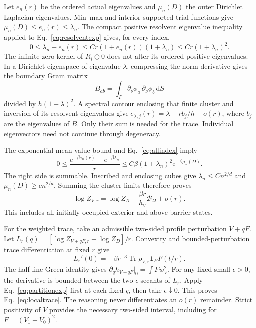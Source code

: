 \documentclass[aps,pra,reprint,superscriptaddress,longbibliography]{revtex4-2}
\newcommand{\dd}{\mathrm d}
\newcommand{\Tr}{\operatorname{Tr}}
\newcommand{\calB}{\mathcal B}
\begin{document}
Let $e_n(r)$ be the ordered actual eigenvalues and $\mu_n(D)$ the outer Dirichlet Laplacian eigenvalues. Min--max and interior-supported trial functions give $\mu_n(D)\le e_n(r)\le\lambda_n$. The compact positive resolvent eigenvalue inequality applied to Eq.~\eqref{eq:resolventexp} gives, for every index,
\begin{equation}
 0\le\lambda_n-e_n(r)
       \le Cr(1+e_n(r))(1+\lambda_n)
       \le Cr(1+\lambda_n)^2.\label{eq:allindex}
\end{equation}
The infinite zero kernel of $R_i\oplus0$ does not alter its ordered positive eigenvalues. In a Dirichlet eigenspace of eigenvalue $\lambda$, compressing the norm derivative gives the boundary Gram matrix
\begin{equation}
 B_{ab}=\int_\Gamma\overline{\partial_\nu\phi_a}\,
          \partial_\nu\phi_b\,\dd S
 \label{eq:gram}
\end{equation}
divided by $h(1+\lambda)^2$. A spectral contour enclosing that finite cluster and inversion of its resolvent eigenvalues give $e_{\lambda,j}(r)=\lambda-rb_j/h+o(r)$, where $b_j$ are the eigenvalues of $B$. Only their sum is needed for the trace. Individual eigenvectors need not continue through degeneracy.

The exponential mean-value bound and Eq.~\eqref{eq:allindex} imply
\begin{equation}
 0\le\frac{e^{-\beta e_n(r)}-e^{-\beta\lambda_n}}r
       \le C\beta(1+\lambda_n)^2 e^{-\beta\mu_n(D)}.\label{eq:heatmajorant}
\end{equation}
The right side is summable. Inscribed and enclosing cubes give $\lambda_n\le Cn^{2/d}$ and $\mu_n(D)\ge cn^{2/d}$. Summing the cluster limits therefore proves
\begin{equation}
 \log Z_{V,r}=\log Z_D+\frac{\beta r}{h_V}\calB_\Omega+o(r).
 \label{eq:partitionexp}
\end{equation}
This includes all initially occupied exterior and above-barrier states.

For the weighted trace, take an admissible two-sided profile perturbation $V+qF$. Let $L_r(q)=[\log Z_{V+qF,r}-\log Z_D]/r$. Convexity and bounded-perturbation trace differentiation at fixed $r$ give
\begin{equation}
 L_r'(0)=-\beta r^{-3}\Tr\rho_{V,r}\mathbf1_EF(t/r).
 \label{eq:convexderivative}
\end{equation}
The half-line Green identity gives $\partial_qh_{V+qF}|_0=\int Fw_V^2$. For any fixed small $\epsilon>0$, the derivative is bounded between the two $\epsilon$-secants of $L_r$. Apply Eq.~\eqref{eq:partitionexp} first at each fixed $q$, then take $\epsilon\downarrow0$. This proves Eq.~\eqref{eq:localtrace}. The reasoning never differentiates an $o(r)$ remainder. Strict positivity of $V$ provides the necessary two-sided interval, including for $F=(V_1-V_0)^2$.
\end{document}
